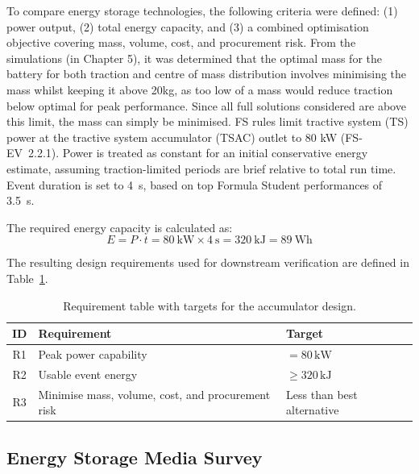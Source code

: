 \documentclass[11pt, a4paper]{report}
\numberwithin{equation}{section}
\begin{document}
\begin{refsection}
To compare energy storage technologies, the following criteria were defined: (1) power output, (2) total energy capacity, and (3) a combined optimisation objective covering mass, volume, cost, and procurement risk. From the simulations (in Chapter 5), it was determined that the optimal mass for the battery for both traction and centre of mass distribution involves minimising the mass whilst keeping it above 20kg, as too low of a mass would reduce traction below optimal for peak performance. Since all full solutions considered are above this limit, the mass can simply be minimised.
FS rules limit tractive system (TS) power at the tractive system accumulator (TSAC) outlet to 80 kW (FS-EV~2.2.1). Power is treated as constant for an initial conservative energy estimate, assuming traction-limited periods are brief relative to total run time. Event duration is set to \SI{4}{\second}, based on top Formula Student performances of \SI{3.5}{\second}.

The required energy capacity is calculated as:
\begin{equation*}
E = P \cdot t = 80~\text{kW} \times 4~\text{s} = 320~\text{kJ} = 89~\text{Wh}
\end{equation*}

The resulting design requirements used for downstream verification are defined in Table~\ref{tab:design_requirement_ids}.

\begin{table}[htbp]
    \centering
    \caption{Requirement table with targets for the accumulator design.}
    \label{tab:design_requirement_ids}
    \footnotesize
    \begin{tabular}{|c|l|l|}
        \hline
        \textbf{ID} & \textbf{Requirement} & \textbf{Target} \\
        \hline
        R1 & Peak power capability & $= 80\,\text{kW}$ \\
        R2 & Usable event energy & $\geq 320\,\text{kJ}$\\
        R3 & Minimise mass, volume, cost, and procurement risk & Less than best alternative \\
        \hline
    \end{tabular}
\end{table}

\subsection{Energy Storage Media Survey}


\end{refsection}
\end{document}
